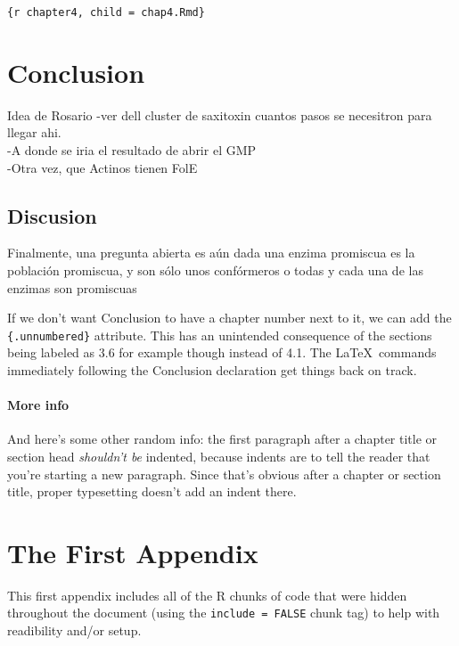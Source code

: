 \documentclass[12pt,twoside]{reedthesis}
\begin{document}
  \texttt{\{r\ chapter4,\ child\ =\ \textquotesingle{}chap4.Rmd\textquotesingle{}\}}
  
  \chapter*{Conclusion}\label{conclusion}
  
  \setcounter{chapter}{4} \setcounter{section}{0}
  
  Idea de Rosario -ver dell cluster de saxitoxin cuantos pasos se
  necesitron para llegar ahi.\\
  -A donde se iria el resultado de abrir el GMP\\
  -Otra vez, que Actinos tienen FolE
  
  \section{Discusion}\label{discusion-1}
  
  Finalmente, una pregunta abierta es aún dada una enzima promiscua es la
  población promiscua, y son sólo unos confórmeros o todas y cada una de
  las enzimas son promiscuas
  
  If we don't want Conclusion to have a chapter number next to it, we can
  add the \texttt{\{.unnumbered\}} attribute. This has an unintended
  consequence of the sections being labeled as 3.6 for example though
  instead of 4.1. The \LaTeX~commands immediately following the Conclusion
  declaration get things back on track.
  
  \subsubsection{More info}\label{more-info}
  
  And here's some other random info: the first paragraph after a chapter
  title or section head \emph{shouldn't be} indented, because indents are
  to tell the reader that you're starting a new paragraph. Since that's
  obvious after a chapter or section title, proper typesetting doesn't add
  an indent there.
  
  \appendix
  
  \chapter{The First Appendix}\label{the-first-appendix}
  
  This first appendix includes all of the R chunks of code that were
  hidden throughout the document (using the \texttt{include\ =\ FALSE}
  chunk tag) to help with readibility and/or setup.
  
\end{document}
